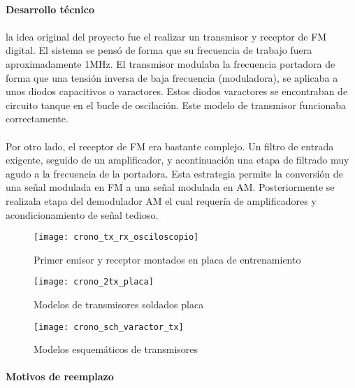 \paragraph{Desarrollo técnico}
\paragraph{}
la idea original del proyecto fue el realizar un transmisor y receptor de FM digital. El sistema se pensó de forma que su frecuencia de trabajo fuera aproximadamente 1MHz. 
El transmisor modulaba la frecuencia portadora de forma que una tensión inversa de baja frecuencia (moduladora), se aplicaba a unos diodos capacitivos o varactores. Estos diodos varactores se encontraban de circuito tanque en el bucle de oscilación.
Este modelo de transmisor funcionaba correctamente.

\paragraph{}
Por otro lado, el receptor de FM era bastante complejo. Un filtro de entrada exigente, seguido de un amplificador, y acontinuación una etapa de filtrado muy agudo a la frecuencia de la portadora. Esta estrategia permite la conversión de una señal modulada en FM a una señal modulada en AM. Posteriormente se realizala etapa del demodulador AM el cual requería de amplificadores y acondicionamiento de señal tedioso.  
\begin{figure}[h]
    \centering
    \texttt{[image: crono\_tx\_rx\_osciloscopio]}
    \caption{Primer emisor y receptor montados en placa de entrenamiento}
    \label{fig:crono_tx_rx_osciloscopio}
\end{figure}

\begin{figure}[h]
    \centering
    \texttt{[image: crono\_2tx\_placa]}
    \caption{Modelos de transmisores soldados placa}
    \label{fig:crono_2tx_placa}
\end{figure}

\begin{figure}[h]
    \centering
    \texttt{[image: crono\_sch\_varactor\_tx]}
    \caption{Modelos esquemáticos de transmisores} 
    \label{fig:crono_sch_varactor_tx}
\end{figure}

\paragraph{Motivos de reemplazo}
